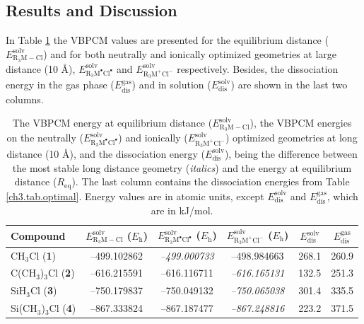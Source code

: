 \subsection{Results and Discussion}

In Table \ref{ch3.tab.solution} the VBPCM values are presented for the equilibrium distance ($E_\mathrm{R_{3}M-Cl}^\mathrm{solv}$) and for both neutrally and ionically optimized geometries at large distance (10 \AA), $E_\mathrm{R_{3}M^\bullet Cl^\bullet}^\mathrm{solv}$ and $E_\mathrm{R_{3}M^{+} Cl^{-}}^\mathrm{solv}$ respectively. Besides, the dissociation energy in the gas phase ($E_\mathrm{dis}^\mathrm{gas}$) and in solution ($E_\mathrm{dis}^\mathrm{solv}$) are shown in the last two columns.
\begin{table}[htp]
\center
\caption{The VBPCM energy at equilibrium distance ($E_\mathrm{R_{3}M-Cl}^\mathrm{solv}$), the VBPCM energies on the neutrally ($E_\mathrm{R_{3}M^\bullet Cl^\bullet}^\mathrm{solv}$) and ionically ($E_\mathrm{R_{3}M^{+} Cl^{-}}^\mathrm{solv}$) optimized geometries at long distance (10 \AA), and the dissociation energy ($E_\mathrm{dis}^\mathrm{solv}$), being the difference between the most stable long distance geometry (\textit{italics}) and the energy at equilibrium distance ($R_\mathrm{eq}$). The last column contains the dissociation energies from Table \ref{ch3.tab.optimal}. Energy values are in atomic units, except $E_\mathrm{dis}^\mathrm{solv}$ and $E_\mathrm{dis}^\mathrm{gas}$, which are in kJ/mol.}
\begin{tabular}{|l|c|c|c|c|c|}
\hline
\textbf{Compound} & $E_\mathrm{R_{3}M-Cl}^\mathrm{solv}$ ($E_{\mathrm{h}}$) & $E_\mathrm{R_{3}M^\bullet Cl^\bullet}^\mathrm{solv}$ ($E_{\mathrm{h}}$) & $E_\mathrm{R_{3}M^{+} Cl^{-}}^\mathrm{solv}$ ($E_{\mathrm{h}}$) & $E_\mathrm{dis}^\mathrm{solv}$&
$E_\mathrm{dis}^\mathrm{gas}$\\
\hline
CH$_3$Cl (\textbf{1})& --499.102862 & \textit{--499.000733} & --498.984663 & 268.1 & 260.9 \\
C(CH$_3$)$_3$Cl (\textbf{2})& --616.215591 & --616.116711 & \textit{--616.165131} & 132.5 & 251.3 \\
SiH$_3$Cl (\textbf{3})& --750.179837 & --750.049132 & \textit{--750.065038} &  301.4 & 335.5 \\
Si(CH$_3$)$_3$Cl (\textbf{4})& --867.333824 & --867.187477 & \textit{--867.248816} & 223.2 & 371.5 \\
\hline
\end{tabular}
\label{ch3.tab.solution}
\end{table} 

